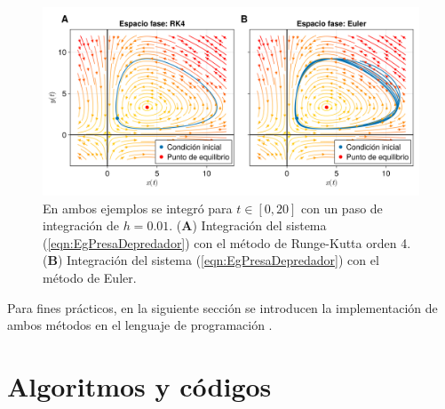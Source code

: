 \begin{figure}[h!]
	\centering
	\includegraphics[scale=0.23]{../../Imagenes/RK4vsEuler}
	\caption{En ambos ejemplos se integró para $t\in[0,20]$ con un paso de integración de $h=0.01$. (\textbf{A}) Integración del sistema (\ref{eqn:EgPresaDepredador}) con el método de Runge-Kutta orden 4. (\textbf{B}) Integración del sistema (\ref{eqn:EgPresaDepredador}) con el método de Euler.}
	\label{fig:Rk4vsEuler}
\end{figure}

Para fines prácticos, en la siguiente sección se introducen la implementación de ambos métodos en el lenguaje de programación \julia.

\section{Algoritmos y códigos}

